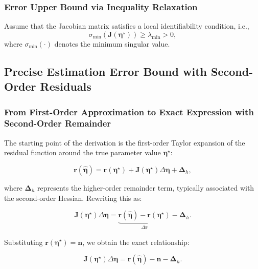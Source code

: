 \documentclass[journal]{IEEEtran}
\begin{document}
\subsubsection{Error Upper Bound via Inequality Relaxation}

Assume that the Jacobian matrix satisfies a local identifiability condition,
i.e.,
\begin{equation}
\sigma_{\min}
\left(
\mathbf{J}(\boldsymbol{\eta}^{\star})
\right)
\ge \lambda_{\min} > 0,
\label{eq:jacobian_condition}
\end{equation}
where $\sigma_{\min}(\cdot)$ denotes the minimum singular value.


\subsection{Precise Estimation Error Bound with Second-Order Residuals}
\label{subsec:error-bound-2nd-order}

\subsubsection{From First-Order Approximation to Exact Expression with Second-Order Remainder}
The starting point of the derivation is the first-order Taylor expansion of the residual function around the true parameter value $\boldsymbol{\eta}^\star$:

\begin{equation}
\mathbf{r}(\hat{\boldsymbol{\eta}}) = \mathbf{r}(\boldsymbol{\eta}^\star) + \mathbf{J}(\boldsymbol{\eta}^\star)\Delta\boldsymbol{\eta} + \boldsymbol{\Delta}_h,
\label{eq:taylor_expansion}
\end{equation}

where $\boldsymbol{\Delta}_h$ represents the higher-order remainder term, typically associated with the second-order Hessian. Rewriting this as:

\begin{equation}
\mathbf{J}(\boldsymbol{\eta}^\star)\Delta\boldsymbol{\eta} = \underbrace{\mathbf{r}(\hat{\boldsymbol{\eta}}) - \mathbf{r}(\boldsymbol{\eta}^\star)}_{\Delta\mathbf{r}} - \boldsymbol{\Delta}_h.
\label{eq:jacobian_expression}
\end{equation}

Substituting $\mathbf{r}(\boldsymbol{\eta}^\star) = \mathbf{n}$, we obtain the exact relationship:

\begin{equation}
\mathbf{J}(\boldsymbol{\eta}^\star)\Delta\boldsymbol{\eta} = \mathbf{r}(\hat{\boldsymbol{\eta}}) - \mathbf{n} - \boldsymbol{\Delta}_h.
\label{eq:exact_relationship}
\end{equation}
\end{document}
